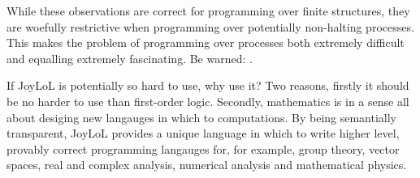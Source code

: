 While these observations are correct for programming over finite 
structures, they are woefully restrictive when programming over 
potentially non-halting processes. This makes the problem of programming 
over processes both extremely difficult and equalling extremely 
fascinating. Be warned: . 

If JoyLoL is potentially so hard to use, why use it? Two reasons, firstly 
it should be no harder to use than first-order logic. Secondly, 
mathematics is in a sense all about desiging new langauges in which to 
 computations. By being semantially transparent, JoyLoL 
provides a unique language in which to write higher level, provably 
correct programming langauges for, for example, group theory, vector 
spaces, real and complex analysis, numerical analysis and mathematical 
physics. 


